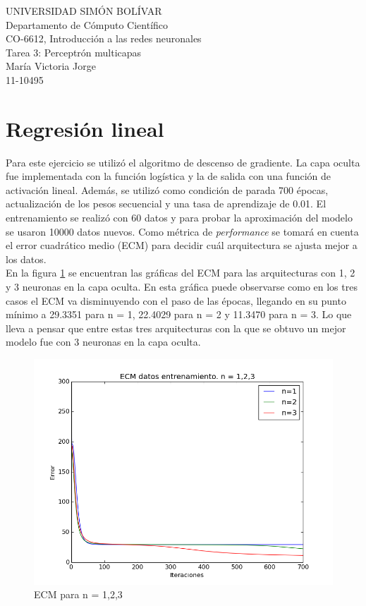 \documentclass[a4paper]{article}
\begin{document}
\noindent UNIVERSIDAD SIMÓN BOLÍVAR\\
Departamento de Cómputo Científico\\
CO-6612, Introducción a las redes neuronales\\
Tarea 3: Perceptrón multicapas\\
María Victoria Jorge\\
11-10495

\section{Regresión lineal}
Para este ejercicio se utilizó el algoritmo de descenso de gradiente. La capa oculta fue implementada con la función logística y la de salida con una función de activación lineal. Además, se utilizó como condición de parada 700 épocas, actualización de los pesos secuencial y una tasa de aprendizaje de 0.01. El entrenamiento se realizó con 60 datos y para probar la aproximación del modelo se usaron 10000 datos nuevos. Como métrica de \textit{performance} se tomará en cuenta el error cuadrático medio (ECM) para decidir cuál arquitectura se ajusta mejor a los datos.\\

En la figura \ref{fig:n1-2-3_train} se encuentran las gráficas del ECM para las arquitecturas con 1, 2 y 3 neuronas en la capa oculta. En esta gráfica puede observarse como en los tres casos el ECM va disminuyendo con el paso de las épocas, llegando en su punto mínimo a 29.3351 para n = 1, 22.4029 para n = 2 y 11.3470 para n = 3. Lo que lleva a pensar que entre estas tres arquitecturas con la que se obtuvo un mejor modelo fue con 3 neuronas en la capa oculta.

	\begin{figure}[H]
	  \centering
	  \includegraphics[scale=0.4]{graficas/n1-2-3_train.png}
	  \caption{ECM para n = 1,2,3}
	  \label{fig:n1-2-3_train}
	\end{figure}
\end{document}
